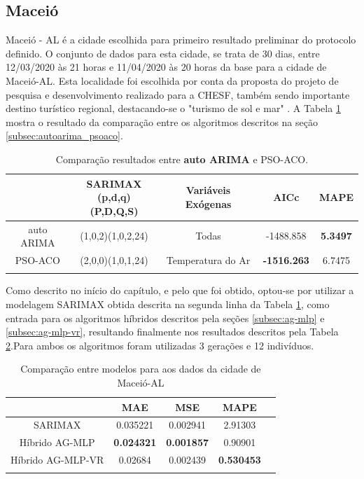 \subsection{Maceió}

Maceió - AL é a cidade escolhida para primeiro resultado preliminar do protocolo definido. O conjunto de dados para esta cidade, se trata de 30 dias, entre 12/03/2020 às 21 horas e 11/04/2020 às 20 horas da base para a cidade de Maceió-AL. Esta localidade foi escolhida por conta da proposta do projeto de pesquisa e desenvolvimento realizado para a CHESF, também sendo importante destino turístico regional, destacando-se o "turismo de sol e mar" \cite{vasconcelos2019turismo}. A Tabela \ref{tab:cap4_comp_maceio_autoarima_psoaco} mostra o resultado da comparação entre os algoritmos descritos na seção \ref{subsec:autoarima_psoaco}. 

\begin{table}[htbp]
\caption{Comparação resultados entre \textbf{auto ARIMA} e PSO-ACO.}
\begin{center}
\begin{tabular}{ccccc}
                    & \Longstack{SARIMAX \\ (p,d,q)(P,D,Q,S)} & Variáveis Exógenas & AICc & MAPE  \\\hline
auto ARIMA & (1,0,2)(1,0,2,24) & Todas & -1488.858 & \textbf{5.3497} \\\hline
PSO-ACO             & (2,0,0)(1,0,1,24) & Temperatura do Ar & \textbf{-1516.263} & 6.7475 \\\hline
\label{tab:cap4_comp_maceio_autoarima_psoaco}
\end{tabular}
\end{center}
\end{table}

Como descrito no início do capítulo, e pelo que foi obtido, optou-se por utilizar a modelagem SARIMAX obtida descrita na segunda linha da Tabela \ref{tab:cap4_comp_maceio_autoarima_psoaco}, como entrada para os algoritmos híbridos descritos pela seções \ref{subsec:ag-mlp} e \ref{subsec:ag-mlp-vr}, resultando finalmente nos resultados descritos pela Tabela \ref{tab:cap4_comp_maceio_agmlp_agmlpvr}.Para ambos os algoritmos foram utilizadas 3 gerações e 12 indivíduos.

\begin{table}[htbp]
\caption{Comparação entre modelos para aos dados da cidade de Maceió-AL}
\begin{center}
\begin{tabular}{ccccc}
                & MAE & MSE & MAPE \\\hline
SARIMAX         & 0.035221 & 0.002941 & 2.91303 \\\hline
Híbrido AG-MLP  & \textbf{0.024321} & \textbf{0.001857} & 0.90901 \\\hline
Híbrido AG-MLP-VR & 0.02684 & 0.002439 & \textbf{0.530453} \\\hline
\label{tab:cap4_comp_maceio_agmlp_agmlpvr}
\end{tabular}
\end{center}
\end{table}

